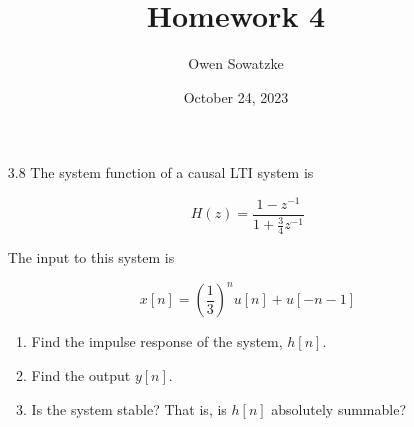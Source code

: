 \documentclass[fleqn]{article}
\title{Homework 4}
\author{Owen Sowatzke}
\date{October 24, 2023}
\makeatletter
\newcommand{\zerodisplayskip}{
	\setlength{\abovedisplayskip}{0pt}%
	\setlength{\belowdisplayskip}{0pt}%
	\setlength{\abovedisplayshortskip}{0pt}%
	\setlength{\belowdisplayshortskip}{0pt}%
	\setlength{\mathindent}{0pt}}
\newenvironment{equationCenter}{\@fleqnfalse\begin{equation*}}{\end{equation*}}
\makeatother
\begin{document}
	\offinterlineskip
	\setlength{\lineskip}{12pt}
	\zerodisplayskip
	\maketitle
	\begin{enumerate}[nolistsep]
		\item[3.8] The system function of a causal LTI system is
	
		\begin{equationCenter}
			H(z) = \frac{1 - z^{-1}}{1 + \frac{3}{4}z^{-1}}
		\end{equationCenter}
		
		The input to this system is
		
		\begin{equationCenter}
			x[n] = \left(\frac{1}{3}\right)^nu[n] + u[-n-1]
		\end{equationCenter}
		
		\begin{enumerate}[nolistsep]
			\item Find the impulse response of the system, $h[n]$.
			
			\item Find the output $y[n]$.
			
			\item Is the system stable? That is, is $h[n]$ absolutely summable?
		\end{enumerate}
	\end{enumerate}
	
\end{document}
